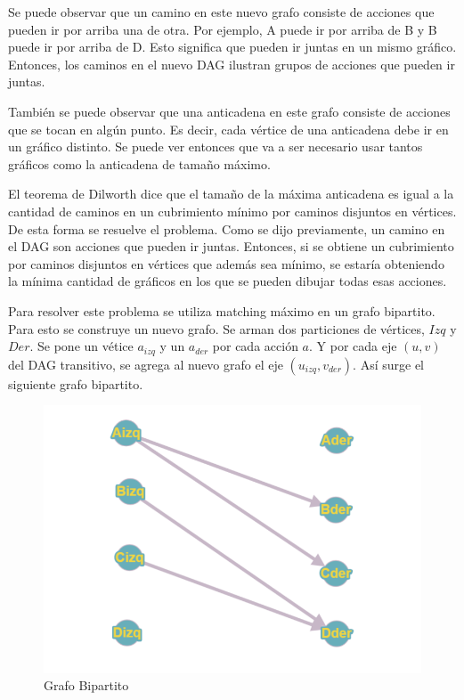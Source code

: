 Se puede observar que un camino en este nuevo grafo consiste de acciones que pueden ir por arriba una de otra. Por ejemplo, A puede ir por arriba de B y B puede ir por arriba de D. Esto significa que pueden ir juntas en un mismo gráfico. Entonces, los caminos en el nuevo DAG ilustran grupos de acciones que pueden ir juntas.

También se puede observar que una anticadena en este grafo consiste de acciones que se tocan en algún punto. Es decir, cada vértice de una anticadena debe ir en un gráfico distinto. Se puede ver entonces que va a ser necesario usar tantos gráficos como la anticadena de tamaño máximo.

El teorema de Dilworth dice que el tamaño de la máxima anticadena es igual a la cantidad de caminos en un cubrimiento mínimo por caminos disjuntos en vértices. De esta forma se resuelve el problema. Como se dijo previamente, un camino en el DAG son acciones que pueden ir juntas. Entonces, si se obtiene un cubrimiento por caminos disjuntos en vértices que además sea mínimo, se estaría obteniendo la mínima cantidad de gráficos en los que se pueden dibujar todas esas acciones.

Para resolver este problema se utiliza matching máximo en un grafo bipartito. Para esto se construye un nuevo grafo. Se arman dos particiones de vértices, $Izq$ y $Der$. Se pone un vétice $a_{izq}$ y un $a_{der}$ por cada acción $a$. Y por cada eje $(u,v)$ del DAG transitivo, se agrega al nuevo grafo el eje $(u_{izq},v_{der})$. Así surge el siguiente grafo bipartito.

\begin{figure}[H]
\centering
\includegraphics[width=15cm]{Imagenes/Ej2b.png}
\caption{Grafo Bipartito}
\end{figure}

